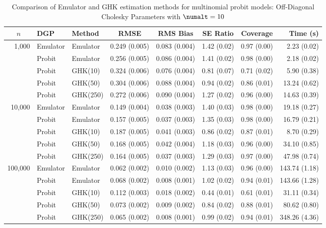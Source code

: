 \begin{table}[htbp]
\centering
\footnotesize
\begin{tabular}{@{}rllrrrrr@{}}
\toprule
\multicolumn{1}{c}{$n$} & \multicolumn{1}{l}{DGP} & \multicolumn{1}{l}{Method} & \multicolumn{1}{c}{RMSE} & \multicolumn{1}{c}{RMS Bias} & \multicolumn{1}{c}{SE Ratio} & \multicolumn{1}{c}{Coverage} & \multicolumn{1}{r}{Time (s)} \\
\midrule
\multirow{5}{*}{1,000} & Emulator & Emulator & 0.249 (0.005) & 0.083 (0.004) & 1.42 (0.02) & 0.97 (0.00) & 2.23 (0.02) \\
 & Probit & Emulator & 0.256 (0.005) & 0.086 (0.004) & 1.41 (0.02) & 0.98 (0.00) & 2.18 (0.02) \\
 & Probit & GHK(10) & 0.324 (0.006) & 0.076 (0.004) & 0.81 (0.07) & 0.71 (0.02) & 5.90 (0.38) \\
 & Probit & GHK(50) & 0.304 (0.006) & 0.088 (0.004) & 0.94 (0.02) & 0.86 (0.01) & 13.24 (0.62) \\
 & Probit & GHK(250) & 0.272 (0.006) & 0.090 (0.004) & 1.27 (0.02) & 0.96 (0.00) & 14.63 (0.39) \\
\midrule
\multirow{5}{*}{10,000} & Emulator & Emulator & 0.149 (0.004) & 0.038 (0.003) & 1.40 (0.03) & 0.98 (0.00) & 19.18 (0.27) \\
 & Probit & Emulator & 0.157 (0.005) & 0.037 (0.003) & 1.35 (0.03) & 0.98 (0.00) & 16.79 (0.21) \\
 & Probit & GHK(10) & 0.187 (0.005) & 0.041 (0.003) & 0.86 (0.02) & 0.87 (0.01) & 8.70 (0.29) \\
 & Probit & GHK(50) & 0.168 (0.005) & 0.042 (0.004) & 1.18 (0.03) & 0.96 (0.00) & 34.10 (0.85) \\
 & Probit & GHK(250) & 0.164 (0.005) & 0.037 (0.003) & 1.29 (0.03) & 0.97 (0.00) & 47.98 (0.74) \\
\midrule
\multirow{5}{*}{100,000} & Emulator & Emulator & 0.062 (0.002) & 0.010 (0.002) & 1.13 (0.03) & 0.96 (0.00) & 143.74 (1.18) \\
 & Probit & Emulator & 0.068 (0.002) & 0.008 (0.001) & 1.02 (0.02) & 0.94 (0.01) & 143.66 (1.28) \\
 & Probit & GHK(10) & 0.112 (0.003) & 0.018 (0.002) & 0.44 (0.01) & 0.61 (0.01) & 31.11 (0.34) \\
 & Probit & GHK(50) & 0.073 (0.002) & 0.009 (0.002) & 0.84 (0.02) & 0.88 (0.01) & 80.62 (0.80) \\
 & Probit & GHK(250) & 0.065 (0.002) & 0.008 (0.001) & 0.99 (0.02) & 0.94 (0.01) & 348.26 (4.36) \\
\bottomrule
\end{tabular}
\caption{Comparison of Emulator and GHK estimation methods for multinomial probit models: Off-Diagonal Cholesky Parameters with $\numalt=10$}
\label{tab:emulator_vs_ghk:10:llower}
\end{table}